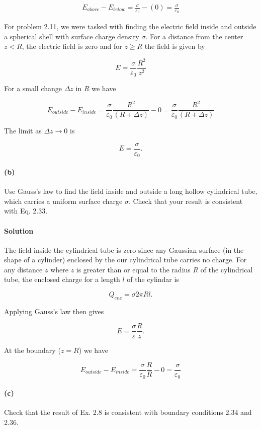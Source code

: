 \documentclass{article}
\begin{document}
\begin{align*}
    E_{above} - E_{below} = \frac{\sigma}{\varepsilon_0} - (0)  = \frac{\sigma}{\varepsilon_0}
\end{align*}

For problem 2.11, we were tasked with finding the electric field inside and outside a spherical shell with surface charge density $\sigma$. For a distance from the center $z < R$, the electric field is zero and for $z \geq R$ the field is given by 

$$
E = \frac{\sigma}{\varepsilon_0} \frac{R^2}{z^2}
$$

For a small change $\Delta z$ in $R$ we have 

$$
E_{outside} - E_{inside} = \frac{\sigma}{\varepsilon_0}\frac{R^2}{(R + \Delta z)} - 0 = \frac{\sigma}{\varepsilon_0}\frac{R^2}{(R + \Delta z)}
$$

The limit as $\Delta z \rightarrow 0 $ is 

$$
E = \frac{\sigma}{\varepsilon_0}.
$$

\paragraph{(b)} Use Gauss’s law to find the field inside and outside a long hollow cylindrical tube, which carries a uniform surface charge $\sigma$. Check that your result is consistent with Eq. 2.33.

\paragraph{Solution} The field inside the cylindrical tube is zero since any Gaussian surface (in the shape of a cylinder) enclosed by the our cylindrical tube carries no charge. For any distance $z$ where $z$ is greater than or equal to the radius $R$ of the cylindrical tube, the enclosed charge for a length $l$ of the cylindar is 

$$
Q_{enc} = \sigma 2\pi R l.
$$

Applying Gauss's law then gives 

$$
E = \frac{\sigma}{\varepsilon}\frac{R}{z}.
$$

At the boundary ($z = R$) we have 

$$
E_{outside} - E_{inside} = \frac{\sigma}{\varepsilon_0}\frac{R}{R} - 0 = \frac{\sigma}{\varepsilon_0}
$$

\paragraph{(c)} Check that the result of Ex. 2.8 is consistent with boundary conditions 2.34 and 2.36.
\end{document}

